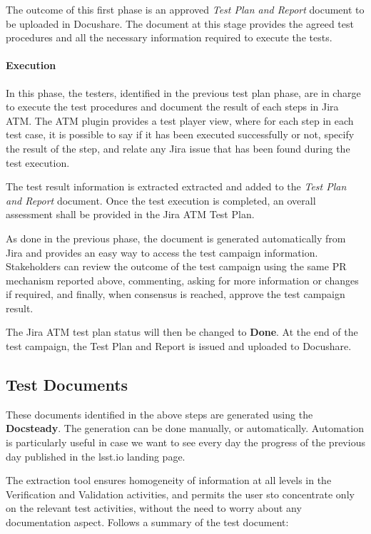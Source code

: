The outcome of this first phase is an approved \textit{Test Plan and Report} document to be uploaded in Docushare. 
The document at this stage provides the agreed test procedures and all the necessary information required to execute the tests.

\paragraph{Execution}
In this phase, the testers, identified in the previous test plan phase, are in charge to execute the test procedures and 
document the result of each steps in Jira ATM.
The ATM plugin provides a test player view, where for each step in each test case, it is possible to say if it has been executed successfully or not,
specify the result of the step, and relate any Jira issue that has been found during the test execution.

The test result information is extracted extracted and added to the \textit{Test Plan and Report} document.
Once the test execution is completed, an overall assessment shall be provided in the Jira ATM Test Plan.

As done in the previous phase, the document is generated automatically from Jira and provides an easy way to access the test campaign information.
Stakeholders can review the outcome of the test campaign using the same PR mechanism reported above, 
commenting, asking for more information or changes if required, and finally, when consensus is reached, approve the test campaign result.

The Jira ATM test plan status will then be changed to \textbf{Done}.
At the end of the test campaign, the Test Plan and Report is issued and uploaded to Docushare.


\subsection{Test Documents}

These documents identified in the above steps are generated using the \textbf{Docsteady}.
The generation can be done manually, or automatically.
Automation is particularly useful in case we want to see every day the progress of the previous day published in the lsst.io landing page.

The extraction tool ensures homogeneity of information at all levels in the Verification and Validation activities, 
and permits the user sto concentrate only on the relevant test activities, without the need to worry about any documentation aspect.
Follows a summary of the test document:


